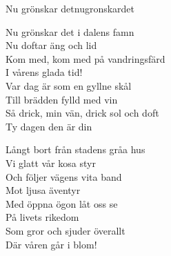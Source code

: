 \begin{song}{Nu grönskar det}{nugronskardet}
\begin{vers}
Nu grönskar det i dalens famn\\
Nu doftar äng och lid\\
Kom med, kom med på vandringsfärd\\
I vårens glada tid!\\
Var dag är som en gyllne skål\\
Till brädden fylld med vin\\
Så drick, min vän, drick sol och doft\\
Ty dagen den är din\\
\end{vers}
\begin{vers}
Långt bort från stadens gråa hus\\
Vi glatt vår kosa styr\\
Och följer vägens vita band\\
Mot ljusa äventyr\\
Med öppna ögon låt oss se\\
På livets rikedom\\
Som gror och sjuder överallt\\
Där våren går i blom!\\
\end{vers}
\end{song}
